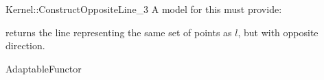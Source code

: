 \begin{ccRefFunctionObjectConcept}{Kernel::ConstructOppositeLine_3}
A model for this must provide:


{returns the line representing the same set of points as $l$,
but with opposite direction.}

\ccRefines
AdaptableFunctor

\ccSeeAlso
{} \\

\end{ccRefFunctionObjectConcept}
